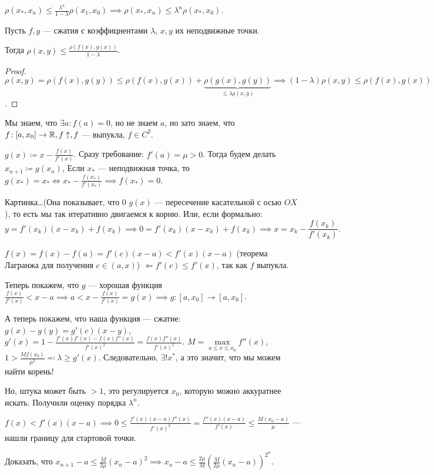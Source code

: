 \begin{remark}
    $\rho(x_*, x_n) \le \frac{\lambda^n}{1 - \lambda}\rho(x_1, x_0) \implies \rho(x_*, x_n) \le \lambda^n \rho(x_*, x_0)$.
\end{remark}
\begin{consequence}
    Пусть $f, g$ --- сжатия с коэффициентами $\lambda$,  $x, y$ их неподвижные точки.

    Тогда $\rho(x, y) \le \frac{\rho(f(x), g(x))}{1-\lambda}$.
\end{consequence}
\begin{proof}
    $\rho(x, y) = \rho(f(x), g(y)) \le \rho(f(x), g(x)) + \underbrace{\rho(g(x), g(y))}_{\le \lambda \rho(x, y)} \implies (1-\lambda)\rho(x, y) \le \rho(f(x), g(x))$.
\end{proof}
\begin{example}
    Мы знаем, что $\exists a\!: f(a) = 0$, но не знаем  $a$, но зато знаем, что  $f\!: [a, x_0] \to \mathbb{R}, f\uparrow, f$ --- выпукла, $f \in C^2$.

    $g(x) \coloneqq x - \frac{f(x)}{f'(x)}$. Сразу требование: $f'(a) = \mu > 0$. Тогда будем делать  $x_{n+1} \coloneqq g(x_n)$, Если $x_*$ --- неподвижная точка, то  $g(x_*) = x_* \iff x_* - \frac{f(x_*)}{f'(x_*)} \implies f(x_*) = 0$.

    Картинка\dots (Она показывает, что 0 $g(x)$ --- пересечение касательной с осью  $OX$), то есть мы так итеративно двигаемся к корню. Или, если формально:
    \[y = f'(x_k)(x-x_k) + f(x_k) \implies 0 = f'(x_k)(x-x_k) + f(x_k) \implies x = x_k - \frac{f(x_k)}{f'(x_k)}.\]

    $f(x) = f(x) - f(a) = f'(c)(x-a) < f'(x)(x-a)$ (теорема Лагранжа для получения $c \in (a, x)$) $\Leftarrow f'(c) \le f'(x)$, так как $f$ выпукла.

    Теперь покажем, что $g$ --- хорошая функция
    $\frac{f(x)}{f'(x)} < x-a \implies a < x - \frac{f(x)}{f'(x)} = g(x) \implies g\!: [a, x_0] \to [a, x_0]$.

    А теперь покажем, что наша функция --- сжатие: $g(x) - g(y) = g'(c)(x-y)$,  $g'(x) = 1 - \frac{f'(x) f'(x) - f(x)f''(x)}{f'(x)^2} = \frac{f(x)f''(x)}{f'(x)^2}$. $M = \max\limits_{a \le x \le x_0} f''(x)$, $1 > \frac{Mf(x_0)}{\mu^2} \eqqcolon \lambda \ge g'(x)$. Следовательно, $\exists! x^*$, а это значит, что мы можем найти корень!

    Но, штука может быть $>1$, это регулируется  $x_0$, которую можно аккуратнее искать. Получили оценку порядка  $\lambda^n$.

     $f(x) < f'(x)(x-a) \implies 0 \le \frac{f'(x)(x-a)f''(x)}{f'(x)^2} = \frac{f''(x)(x-a)}{f'(x)} \le \frac{M(x_0 - a)}{\mu}$ --- нашли границу для стартовой точки.

     \begin{exerc}
         Доказать, что $x_{n+1} - a \le \frac{M}{2\mu}(x_n-a)^2 \implies x_n -a \le \frac{2\mu}{M}(\frac{M}{2\mu}(x_n-a))^{2^n}$.
     \end{exerc}
\end{example}
